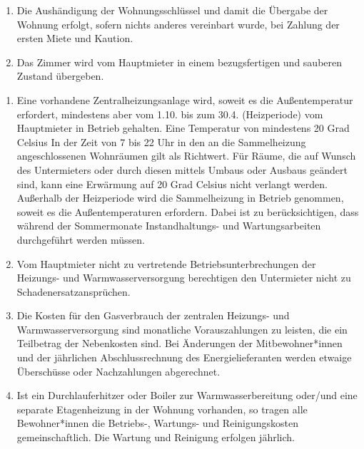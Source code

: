\documentclass{scrreprt}[12pt,a4paper,twoside,duplex]
\begin{document}
\begin{contract}
\label{clause:zustand}
\begin{enumerate}
	\item Die Aushändigung der Wohnungsschlüssel und damit die Übergabe der
	Wohnung erfolgt, sofern nichts anderes vereinbart wurde, bei
	Zahlung der ersten Miete und Kaution.
	
	\item Das Zimmer wird vom Hauptmieter in einem bezugsfertigen und sauberen Zustand übergeben.
\end{enumerate}
\end{contract}

\begin{contract}
\label{clause:heizung}
\begin{enumerate}
	\item Eine vorhandene Zentralheizungsanlage wird, soweit es die	Au{\ss}entemperatur erfordert, mindestens aber vom 1.10. bis zum 30.4. (Heizperiode) vom Hauptmieter in Betrieb gehalten. Eine Temperatur von mindestens 20 Grad Celsius In der Zeit von 7 bis 22 Uhr in den an die Sammelheizung angeschlossenen Wohnräumen gilt als Richtwert. Für Räume, die auf Wunsch des Untermieters oder durch diesen mittels Umbaus oder Ausbaus geändert sind, kann eine Erwärmung auf 20 Grad Celsius nicht verlangt werden. Au{\ss}erhalb der Heizperiode wird die Sammelheizung in Betrieb genommen, soweit es die Au{\ss}entemperaturen erfordern. Dabei ist zu berücksichtigen, dass während der Sommermonate Instandhaltungs- und Wartungsarbeiten durchgeführt werden müssen.
	
	\item Vom Hauptmieter nicht zu vertretende Betriebsunterbrechungen der Heizungs- und Warmwasserversorgung berechtigen den Untermieter nicht zu Schadenersatzansprüchen.
	
	\item Die Kosten für den Gasverbrauch der zentralen Heizungs- und Warmwasserversorgung sind monatliche Vorauszahlungen zu leisten, die ein Teilbetrag der Nebenkosten sind. Bei Änderungen der Mitbewohner*innen und der jährlichen Abschlussrechnung des Energielieferanten werden etwaige Überschüsse oder Nachzahlungen abgerechnet.
	
	\item Ist ein Durchlauferhitzer oder Boiler zur Warmwasserbereitung oder/und eine separate Etagenheizung in der Wohnung vorhanden, so tragen alle Bewohner*innen die Betriebs-, Wartungs- und Reinigungskosten gemeinschaftlich. Die Wartung und Reinigung erfolgen jährlich.
\end{enumerate}
\end{contract}
\end{document}
